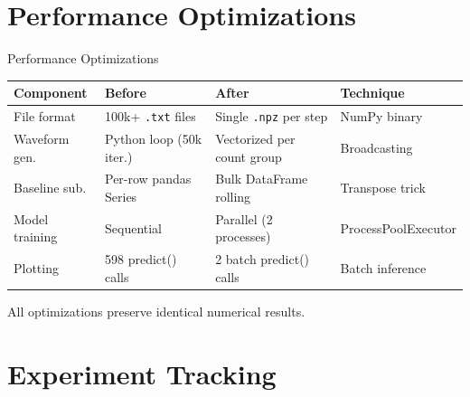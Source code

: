 \documentclass[aspectratio=169]{beamer}
\begin{document}
\section{Performance Optimizations}

\begin{frame}{Performance Optimizations}

\begin{tabular}{@{}llll@{}}
\toprule
\textbf{Component} & \textbf{Before} & \textbf{After} & \textbf{Technique} \\
\midrule
File format & 100k+ \texttt{.txt} files & Single \texttt{.npz} per step & NumPy binary \\
Waveform gen. & Python loop (50k iter.) & Vectorized per count group & Broadcasting \\
Baseline sub. & Per-row pandas Series & Bulk DataFrame rolling & Transpose trick \\
Model training & Sequential & Parallel (2 processes) & ProcessPoolExecutor \\
Plotting & 598 predict() calls & 2 batch predict() calls & Batch inference \\
\bottomrule
\end{tabular}

\medskip
\begin{center}
\small All optimizations preserve identical numerical results.
\end{center}
\end{frame}

\section{Experiment Tracking}
\end{document}
